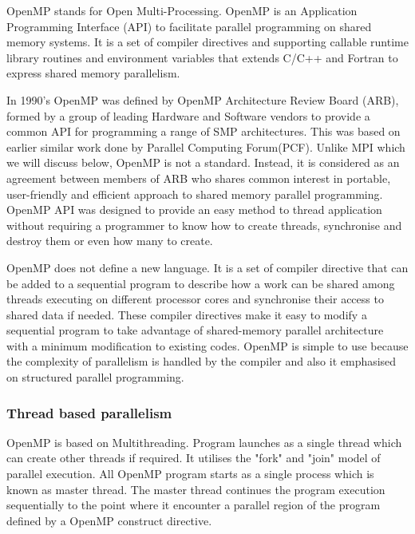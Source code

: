 \label{openmp}
OpenMP stands for Open Multi-Processing. OpenMP is an Application Programming Interface (API) to facilitate parallel programming  on shared memory systems. \citep{chapman08}  It is a set of compiler directives and supporting callable runtime library routines and environment variables that extends C/C++ and Fortran to express shared memory parallelism. \citep{dagum:98}

In 1990's OpenMP was defined by OpenMP Architecture Review Board (ARB), formed by a group of leading Hardware and Software vendors to provide a common API for programming a range of SMP architectures. This was based on earlier similar work done by Parallel Computing Forum(PCF). Unlike MPI which we will discuss below, OpenMP is not a standard. Instead, it is considered as an agreement between members of ARB who shares common interest in portable, user-friendly and efficient approach to shared memory parallel programming. \citep{chapman08}
OpenMP API was designed to provide an easy method to thread application without requiring a programmer to know how to create threads, synchronise and destroy them or even how many to create.

OpenMP does not define a new language. It is a set of compiler directive that can be added to a sequential  program to describe how a work can be shared among threads executing on different processor cores and synchronise their access to shared data if needed. These compiler directives make it easy to modify a sequential program to take advantage of  shared-memory parallel architecture with a minimum modification to existing codes.
OpenMP is simple to use because the complexity of parallelism is handled by the compiler and also it emphasised on structured parallel programming. \citep{chapman08}

\subsubsection{Thread based parallelism}
OpenMP is based on Multithreading. Program launches as a single thread which can create other threads if required. It utilises the "fork" and "join" model of parallel execution.  All OpenMP program starts as a single process which is known as master thread. The master thread continues the program execution sequentially to the point where it encounter a parallel region of the program defined by a OpenMP construct directive. \citep{Barney:16-openmp}

